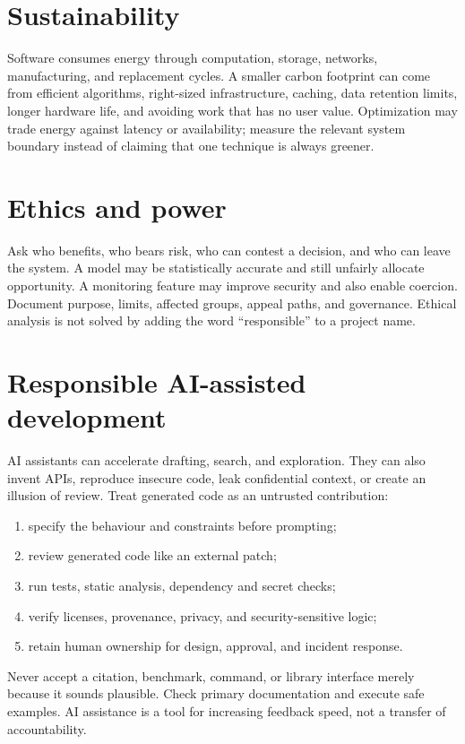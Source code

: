\section{Sustainability}
Software consumes energy through computation, storage, networks, manufacturing,
and replacement cycles. A smaller carbon footprint can come from efficient
algorithms, right-sized infrastructure, caching, data retention limits, longer
hardware life, and avoiding work that has no user value. Optimization may trade
energy against latency or availability; measure the relevant system boundary
instead of claiming that one technique is always greener.

\section{Ethics and power}
Ask who benefits, who bears risk, who can contest a decision, and who can leave
the system. A model may be statistically accurate and still unfairly allocate
opportunity. A monitoring feature may improve security and also enable coercion.
Document purpose, limits, affected groups, appeal paths, and governance. Ethical
analysis is not solved by adding the word “responsible” to a project name.

\section{Responsible AI-assisted development}
AI assistants can accelerate drafting, search, and exploration. They can also
invent APIs, reproduce insecure code, leak confidential context, or create an
illusion of review. Treat generated code as an untrusted contribution:

\begin{enumerate}
  \item specify the behaviour and constraints before prompting;
  \item review generated code like an external patch;
  \item run tests, static analysis, dependency and secret checks;
  \item verify licenses, provenance, privacy, and security-sensitive logic;
  \item retain human ownership for design, approval, and incident response.
\end{enumerate}

Never accept a citation, benchmark, command, or library interface merely because
it sounds plausible. Check primary documentation and execute safe examples.
AI assistance is a tool for increasing feedback speed, not a transfer of
accountability.

